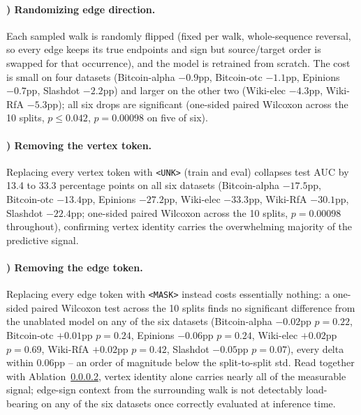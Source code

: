 \documentclass[sigconf, review, anonymous]{acmart}
\newcounter{ablation}
\renewcommand{\theablation}{\Alph{ablation}}
\theoremstyle{plain}
\theoremstyle{definition}
\begin{document}
\paragraph{\theablation) Randomizing edge direction.}
\label{abl:dirflip}
Each sampled walk is randomly flipped (fixed per walk, whole-sequence reversal, so every edge keeps its true endpoints and sign but source/target order is swapped for that occurrence), and the model is retrained from scratch. The cost is small on four datasets (Bitcoin-alpha $-0.9$pp, Bitcoin-otc $-1.1$pp, Epinions $-0.7$pp, Slashdot $-2.2$pp) and larger on the other two (Wiki-elec $-4.3$pp, Wiki-RfA $-5.3$pp); all six drops are significant (one-sided paired Wilcoxon across the 10 splits, $p\le0.042$, $p=0.00098$ on five of six).

\paragraph{\theablation) Removing the vertex token.}
\label{abl:masknode}
Replacing every vertex token with \texttt{<UNK>} (train and eval) collapses test AUC by 13.4 to 33.3 percentage points on all six datasets (Bitcoin-alpha $-17.5$pp, Bitcoin-otc $-13.4$pp, Epinions $-27.2$pp, Wiki-elec $-33.3$pp, Wiki-RfA $-30.1$pp, Slashdot $-22.4$pp; one-sided paired Wilcoxon across the 10 splits, $p=0.00098$ throughout), confirming vertex identity carries the overwhelming majority of the predictive signal.

\paragraph{\theablation) Removing the edge token.}
\label{abl:maskedge}
Replacing every edge token with \texttt{<MASK>} instead costs essentially nothing: a one-sided paired Wilcoxon test across the 10 splits finds no significant difference from the unablated model on any of the six datasets (Bitcoin-alpha $-0.02$pp $p=0.22$, Bitcoin-otc $+0.01$pp $p=0.24$, Epinions $-0.06$pp $p=0.24$, Wiki-elec $+0.02$pp $p=0.69$, Wiki-RfA $+0.02$pp $p=0.42$, Slashdot $-0.05$pp $p=0.07$), every delta within $0.06$pp -- an order of magnitude below the split-to-split std. Read together with Ablation~\ref{abl:masknode}, vertex identity alone carries nearly all of the measurable signal; edge-sign context from the surrounding walk is not detectably load-bearing on any of the six datasets once correctly evaluated at inference time.
\end{document}
